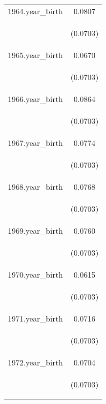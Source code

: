 \documentclass[]{article}
\begin{document}
\begin{center}
\begin{tabular}{lc}
1964.year\_birth & 0.0807 \\
\vspace{4pt} & \begin{footnotesize}(0.0703)\end{footnotesize} \\
1965.year\_birth & 0.0670 \\
\vspace{4pt} & \begin{footnotesize}(0.0703)\end{footnotesize} \\
1966.year\_birth & 0.0864 \\
\vspace{4pt} & \begin{footnotesize}(0.0703)\end{footnotesize} \\
1967.year\_birth & 0.0774 \\
\vspace{4pt} & \begin{footnotesize}(0.0703)\end{footnotesize} \\
1968.year\_birth & 0.0768 \\
\vspace{4pt} & \begin{footnotesize}(0.0703)\end{footnotesize} \\
1969.year\_birth & 0.0760 \\
\vspace{4pt} & \begin{footnotesize}(0.0703)\end{footnotesize} \\
1970.year\_birth & 0.0615 \\
\vspace{4pt} & \begin{footnotesize}(0.0703)\end{footnotesize} \\
1971.year\_birth & 0.0716 \\
\vspace{4pt} & \begin{footnotesize}(0.0703)\end{footnotesize} \\
1972.year\_birth & 0.0704 \\
\vspace{4pt} & \begin{footnotesize}(0.0703)\end{footnotesize} \\

\end{tabular}
\end{center}
\end{document}
